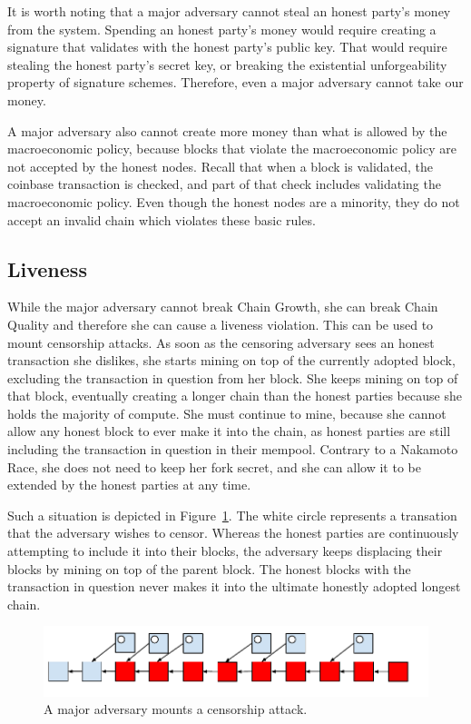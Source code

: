 It is worth noting that a major adversary cannot steal an honest party's money from the system.
Spending an honest party's money would require creating a signature that validates with the honest
party's public key. That would require stealing the honest party's secret key, or breaking
the existential unforgeability property of signature schemes. Therefore, even a major adversary
cannot take our money.

A major adversary also cannot create more money than what is allowed by the macroeconomic policy,
because blocks that violate the macroeconomic policy are not accepted by the honest nodes.
Recall that when a block is validated, the coinbase transaction is checked, and part of that
check includes validating the macroeconomic policy. Even though the honest nodes are a minority,
they do not accept an invalid chain which violates these basic rules.

\subsection*{Liveness}
While the major adversary cannot break Chain Growth, she can break Chain Quality and therefore
she can cause a liveness violation. This can be used to mount censorship attacks. As soon as
the censoring adversary sees an honest transaction she dislikes, she starts mining on top of
the currently adopted block, excluding the transaction in question from her block. She
keeps mining on top of that block, eventually creating a longer chain than the honest parties
because she holds the majority of compute. She must continue to mine, because she cannot allow
any honest block to ever make it into the chain, as honest parties are still including the
transaction in question in their mempool. Contrary to a Nakamoto Race, she does not need to keep
her fork secret, and she can allow it to be extended by the honest parties at any time.

Such a situation is depicted in Figure~\ref{fig.censorship-attack}. The white circle represents
a transation that the adversary wishes to censor. Whereas the honest parties are continuously
attempting to include it into their blocks, the adversary keeps displacing their blocks by
mining on top of the parent block. The honest blocks with the transaction in question never
makes it into the ultimate honestly adopted longest chain.

\begin{figure}[h]
  \centering
  \includegraphics[width=\columnwidth,keepaspectratio]{figures/censorship-attack.pdf}
  \caption{A major adversary mounts a censorship attack.}
  \label{fig.censorship-attack}
\end{figure}

